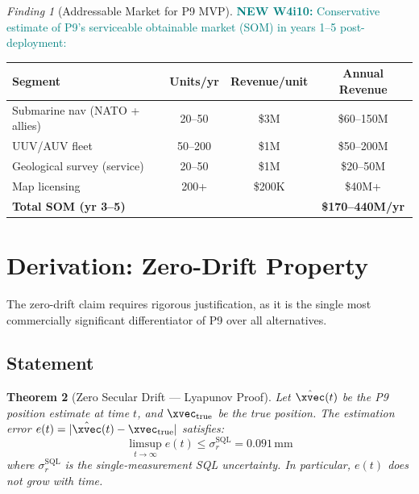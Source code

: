 \documentclass[11pt]{article}
\newtheorem{theorem}{Theorem}[section]
\theoremstyle{definition}
\theoremstyle{remark}
\newtheorem{finding}[theorem]{Finding}
\newcommand{\SQL}{\mathrm{SQL}}
\newcommand{\newfinding}[1]{\textcolor{teal}{\textbf{NEW W4i10:} #1}}
\begin{document}
\begin{finding}[Addressable Market for P9 MVP]
\label{find:addressable-market}
\newfinding{Conservative estimate of P9's serviceable obtainable market (SOM)
in years 1--5 post-deployment:}

\begin{center}
\begin{tabular}{@{}lccc@{}}
\toprule
Segment & Units/yr & Revenue/unit & Annual Revenue \\
\midrule
Submarine nav (NATO + allies) & 20--50 & \$3M & \$60--150M \\
UUV/AUV fleet & 50--200 & \$1M & \$50--200M \\
Geological survey (service) & 20--50 & \$1M & \$20--50M \\
Map licensing & 200+ & \$200K & \$40M+ \\
\midrule
\textbf{Total SOM (yr 3--5)} & & & \textbf{\$170--440M/yr} \\
\bottomrule
\end{tabular}
\end{center}
\end{finding}

\section{Derivation: Zero-Drift Property}
\label{sec:zero-drift}

The zero-drift claim requires rigorous justification, as it is the single most
commercially significant differentiator of P9 over all alternatives.

\subsection{Statement}

\begin{theorem}[Zero Secular Drift --- Lyapunov Proof]
\label{thm:lyapunov}
Let $\hat{\xvec}(t)$ be the P9 position estimate at time $t$, and $\xvec_{\mathrm{true}}$
be the true position. The estimation error $e(t) = |\hat{\xvec}(t) - \xvec_{\mathrm{true}}|$
satisfies:
\begin{equation}
\limsup_{t \to \infty} e(t) \leq \sigma_r^{\SQL} = 0.091\,\mathrm{mm}
\label{eq:zero-drift}
\end{equation}
where $\sigma_r^{\SQL}$ is the single-measurement SQL uncertainty. In particular,
$e(t)$ does not grow with time.
\end{theorem}
\end{document}
